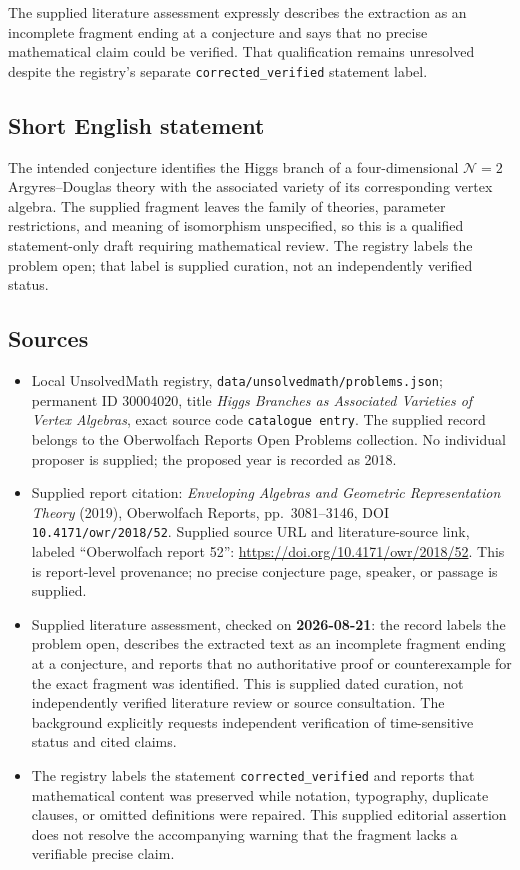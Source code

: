 \documentclass[11pt]{article}
\begin{document}
The supplied literature assessment expressly describes the extraction as an incomplete fragment ending at a conjecture and says that no precise mathematical claim could be verified. That qualification remains unresolved despite the registry's separate \texttt{corrected\_verified} statement label.
\subsection{Short English statement}
The intended conjecture identifies the Higgs branch of a four-dimensional \(\mathcal N=2\) Argyres--Douglas theory with the associated variety of its corresponding vertex algebra. The supplied fragment leaves the family of theories, parameter restrictions, and meaning of isomorphism unspecified, so this is a qualified statement-only draft requiring mathematical review. The registry labels the problem open; that label is supplied curation, not an independently verified status.
\subsection{Sources}
\begin{itemize}
\item Local UnsolvedMath registry, \texttt{data/unsolvedmath/problems.json}; permanent ID \(30004020\), title \emph{Higgs Branches as Associated Varieties of Vertex Algebras}, exact source code \texttt{catalogue entry}. The supplied record belongs to the Oberwolfach Reports Open Problems collection. No individual proposer is supplied; the proposed year is recorded as 2018.
\item Supplied report citation: \emph{Enveloping Algebras and Geometric Representation Theory} (2019), Oberwolfach Reports, pp.\ 3081--3146, DOI \texttt{10.4171/owr/2018/52}. Supplied source URL and literature-source link, labeled ``Oberwolfach report 52'': \url{https://doi.org/10.4171/owr/2018/52}. This is report-level provenance; no precise conjecture page, speaker, or passage is supplied.
\item Supplied literature assessment, checked on \textbf{2026-08-21}: the record labels the problem open, describes the extracted text as an incomplete fragment ending at a conjecture, and reports that no authoritative proof or counterexample for the exact fragment was identified. This is supplied dated curation, not independently verified literature review or source consultation. The background explicitly requests independent verification of time-sensitive status and cited claims.
\item The registry labels the statement \texttt{corrected\_verified} and reports that mathematical content was preserved while notation, typography, duplicate clauses, or omitted definitions were repaired. This supplied editorial assertion does not resolve the accompanying warning that the fragment lacks a verifiable precise claim.
\end{itemize}
\end{document}

